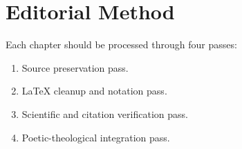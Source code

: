\section*{Editorial Method}

Each chapter should be processed through four passes:

\begin{enumerate}
  \item Source preservation pass.
  \item LaTeX cleanup and notation pass.
  \item Scientific and citation verification pass.
  \item Poetic-theological integration pass.
\end{enumerate}
